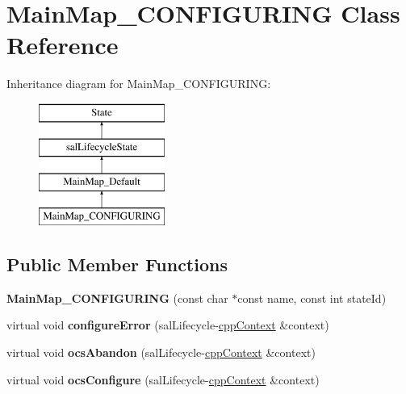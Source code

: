 \hypertarget{class_main_map___c_o_n_f_i_g_u_r_i_n_g}{\section{Main\-Map\-\_\-\-C\-O\-N\-F\-I\-G\-U\-R\-I\-N\-G Class Reference}
\label{class_main_map___c_o_n_f_i_g_u_r_i_n_g}
}
Inheritance diagram for Main\-Map\-\_\-\-C\-O\-N\-F\-I\-G\-U\-R\-I\-N\-G\-:\begin{figure}[H]
\begin{center}
\leavevmode
\includegraphics[height=4.000000cm]{class_main_map___c_o_n_f_i_g_u_r_i_n_g}
\end{center}
\end{figure}
\subsection*{Public Member Functions}
\begin{DoxyCompactItemize}
\item 
\hypertarget{class_main_map___c_o_n_f_i_g_u_r_i_n_g_a4a628ef377e47019ab7b03b243fc304e}{{\bfseries Main\-Map\-\_\-\-C\-O\-N\-F\-I\-G\-U\-R\-I\-N\-G} (const char $\ast$const name, const int state\-Id)}\label{class_main_map___c_o_n_f_i_g_u_r_i_n_g_a4a628ef377e47019ab7b03b243fc304e}

\item 
\hypertarget{class_main_map___c_o_n_f_i_g_u_r_i_n_g_a6858f68400aed8f12d65489f2698515c}{virtual void {\bfseries configure\-Error} (sal\-Lifecycle-\/\hyperlink{classcpp_context}{cpp\-Context} \&context)}\label{class_main_map___c_o_n_f_i_g_u_r_i_n_g_a6858f68400aed8f12d65489f2698515c}

\item 
\hypertarget{class_main_map___c_o_n_f_i_g_u_r_i_n_g_afd15e4e4a800ab7cd8a7a74756da9e7d}{virtual void {\bfseries ocs\-Abandon} (sal\-Lifecycle-\/\hyperlink{classcpp_context}{cpp\-Context} \&context)}\label{class_main_map___c_o_n_f_i_g_u_r_i_n_g_afd15e4e4a800ab7cd8a7a74756da9e7d}

\item 
\hypertarget{class_main_map___c_o_n_f_i_g_u_r_i_n_g_a3978d4b67799d01afd12740000e25d99}{virtual void {\bfseries ocs\-Configure} (sal\-Lifecycle-\/\hyperlink{classcpp_context}{cpp\-Context} \&context)}\label{class_main_map___c_o_n_f_i_g_u_r_i_n_g_a3978d4b67799d01afd12740000e25d99}

\end{DoxyCompactItemize}
